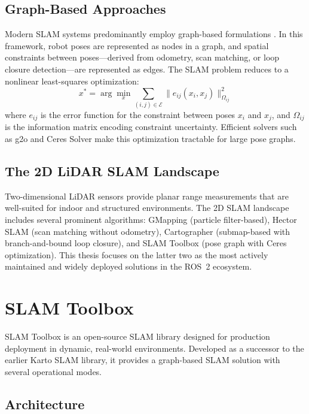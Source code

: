 \subsection{Graph-Based Approaches}

Modern SLAM systems predominantly employ graph-based formulations \citep{grisetti2010gmapping, dellaert2017factor}. In this framework, robot poses are represented as nodes in a graph, and spatial constraints between poses---derived from odometry, scan matching, or loop closure detection---are represented as edges. The SLAM problem reduces to a nonlinear least-squares optimization:
\begin{equation}
x^* = \arg\min_x \sum_{(i,j) \in \mathcal{E}} \| e_{ij}(x_i, x_j) \|^2_{\Omega_{ij}}
\end{equation}
where $e_{ij}$ is the error function for the constraint between poses $x_i$ and $x_j$, and $\Omega_{ij}$ is the information matrix encoding constraint uncertainty. Efficient solvers such as g2o \citep{kummerle2011g2o} and Ceres Solver \citep{agarwal2010ceres} make this optimization tractable for large pose graphs.

\subsection{The 2D LiDAR SLAM Landscape}

Two-dimensional LiDAR sensors provide planar range measurements that are well-suited for indoor and structured environments. The 2D SLAM landscape includes several prominent algorithms: GMapping (particle filter-based), Hector SLAM \citep{kohlbrecher2011hector} (scan matching without odometry), Cartographer \citep{hess2016cartographer} (submap-based with branch-and-bound loop closure), and SLAM Toolbox \citep{macenski2021slam} (pose graph with Ceres optimization). This thesis focuses on the latter two as the most actively maintained and widely deployed solutions in the ROS~2 ecosystem.

\section{SLAM Toolbox}

SLAM Toolbox \citep{macenski2021slam} is an open-source SLAM library designed for production deployment in dynamic, real-world environments. Developed as a successor to the earlier Karto SLAM library, it provides a graph-based SLAM solution with several operational modes.

\subsection{Architecture}

